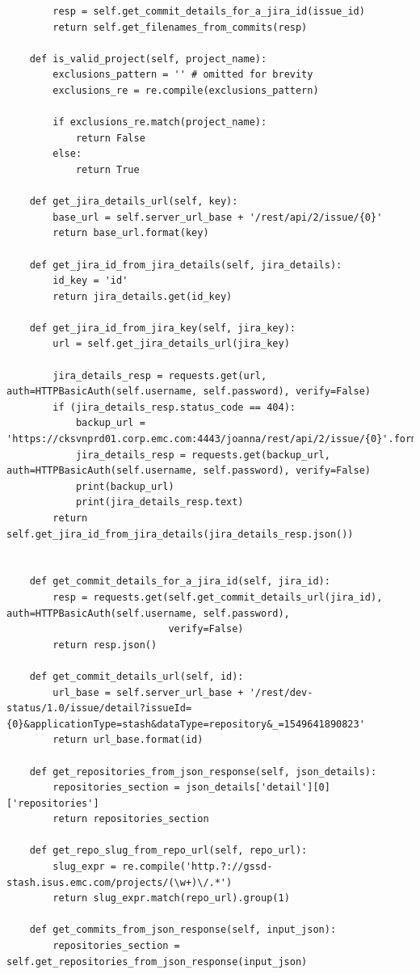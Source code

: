 \begin{landscape}
\begin{code}
\begin{verbatim}
        resp = self.get_commit_details_for_a_jira_id(issue_id)
        return self.get_filenames_from_commits(resp)

    def is_valid_project(self, project_name):
        exclusions_pattern = '' # omitted for brevity
        exclusions_re = re.compile(exclusions_pattern)

        if exclusions_re.match(project_name):
            return False
        else:
            return True

    def get_jira_details_url(self, key):
        base_url = self.server_url_base + '/rest/api/2/issue/{0}'
        return base_url.format(key)

    def get_jira_id_from_jira_details(self, jira_details):
        id_key = 'id'
        return jira_details.get(id_key)

    def get_jira_id_from_jira_key(self, jira_key):
        url = self.get_jira_details_url(jira_key)

        jira_details_resp = requests.get(url, auth=HTTPBasicAuth(self.username, self.password), verify=False)
        if (jira_details_resp.status_code == 404):
            backup_url = 'https://cksvnprd01.corp.emc.com:4443/joanna/rest/api/2/issue/{0}'.format(jira_key)
            jira_details_resp = requests.get(backup_url, auth=HTTPBasicAuth(self.username, self.password), verify=False)
            print(backup_url)
            print(jira_details_resp.text)
        return self.get_jira_id_from_jira_details(jira_details_resp.json())


    def get_commit_details_for_a_jira_id(self, jira_id):
        resp = requests.get(self.get_commit_details_url(jira_id), auth=HTTPBasicAuth(self.username, self.password),
                            verify=False)
        return resp.json()

    def get_commit_details_url(self, id):
        url_base = self.server_url_base + '/rest/dev-status/1.0/issue/detail?issueId={0}&applicationType=stash&dataType=repository&_=1549641890823'
        return url_base.format(id)

    def get_repositories_from_json_response(self, json_details):
        repositories_section = json_details['detail'][0]['repositories']
        return repositories_section

    def get_repo_slug_from_repo_url(self, repo_url):
        slug_expr = re.compile('http.?://gssd-stash.isus.emc.com/projects/(\w+)\/.*')
        return slug_expr.match(repo_url).group(1)

    def get_commits_from_json_response(self, input_json):
        repositories_section = self.get_repositories_from_json_response(input_json)


\end{verbatim}
\end{code}
\end{landscape}
